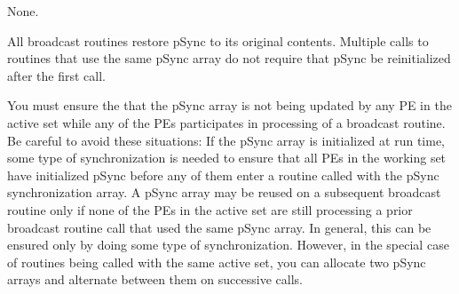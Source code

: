 {
{
}
    {None.}
}
{
       All \OSH{} broadcast routines restore pSync to its original contents.
       Multiple	calls to \OSH{} routines that use the same pSync array do not
       require that pSync be reinitialized after the first call.

       You must ensure the that the pSync array is not being updated by any PE
       in the active set while any of the PEs participates in processing of a
       \OSH{} broadcast routine. Be careful to avoid these situations: If the
       pSync array is initialized at run time, some type of synchronization is
       needed to ensure that all PEs in the working set have initialized pSync
       before any of them enter a \OSH{} routine called with the pSync
       synchronization array. A pSync array may be reused on a subsequent
       \OSH{} broadcast routine only if none of the PEs in the active set are
       still processing a prior \OSH{} broadcast routine call that used the
       same pSync array. In general, this can be ensured only by doing some
       type of synchronization. However, in the special case of \OSH{}
       routines being called with the same active set, you can allocate two
       pSync arrays and alternate between them on successive calls.
}
\eAPI 

